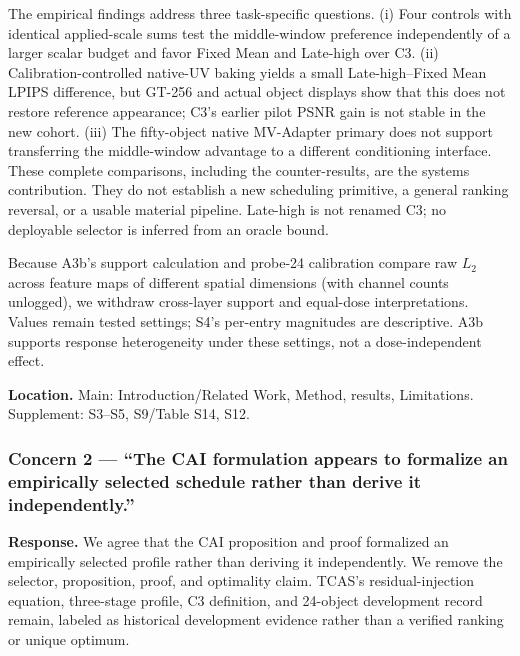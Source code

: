 \documentclass[
  10pt,
]{article}
\begin{document}
The empirical findings address three task-specific questions. (i) Four
controls with identical applied-scale sums test the middle-window
preference independently of a larger scalar budget and favor Fixed Mean
and Late-high over C3. (ii) Calibration-controlled native-UV baking
yields a small Late-high--Fixed Mean LPIPS difference, but GT-256 and
actual object displays show that this does not restore reference
appearance; C3's earlier pilot PSNR gain is not stable in the new
cohort. (iii) The fifty-object native MV-Adapter primary does not
support transferring the middle-window advantage to a different
conditioning interface. These complete comparisons, including the
counter-results, are the systems contribution. They do not establish a
new scheduling primitive, a general ranking reversal, or a usable
material pipeline. Late-high is not renamed C3; no deployable selector
is inferred from an oracle bound.

Because A3b's support calculation and probe-24 calibration compare raw
\(L_2\) across feature maps of different spatial dimensions (with
channel counts unlogged), we withdraw cross-layer support and equal-dose
interpretations. Values remain tested settings; S4's per-entry
magnitudes are descriptive. A3b supports response heterogeneity under
these settings, not a dose-independent effect.

\textbf{Location.} Main: Introduction/Related Work, Method, results,
Limitations. Supplement: S3--S5, S9/Table S14, S12.

\hypertarget{concern-2-the-cai-formulation-appears-to-formalize-an-empirically-selected-schedule-rather-than-derive-it-independently.}{%
\subsubsection{Concern 2 --- ``The CAI formulation appears to formalize
an empirically selected schedule rather than derive it
independently.''}\label{concern-2-the-cai-formulation-appears-to-formalize-an-empirically-selected-schedule-rather-than-derive-it-independently.}}

\textbf{Response.} We agree that the CAI proposition and proof
formalized an empirically selected profile rather than deriving it
independently. We remove the selector, proposition, proof, and
optimality claim. TCAS's residual-injection equation, three-stage
profile, C3 definition, and 24-object development record remain, labeled
as historical development evidence rather than a verified ranking or
unique optimum.
\end{document}
